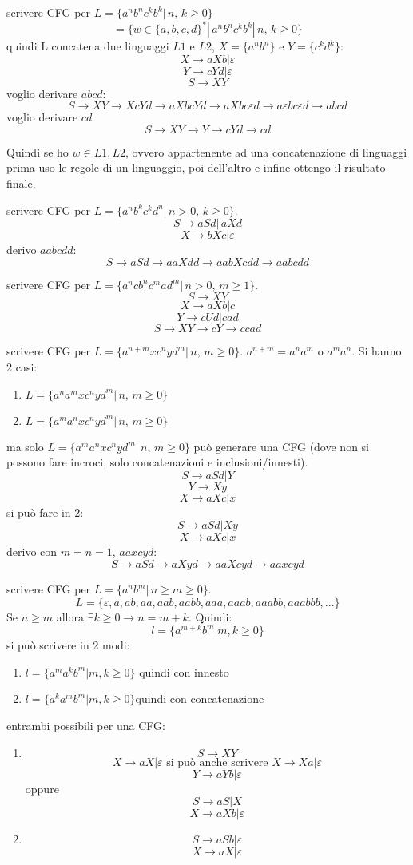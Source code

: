\documentclass[a4paper,12pt, oneside]{book}
\begin{document}
\begin{esempio}
scrivere CFG per $L=\{a^nb^nc^kb^k|\, n,\,k\geq 0\}
$
$$=\{w\in\{a,b,c,d\}^*|\,a^nb^nc^kb^k|\, n,\,k\geq 0\}$$
quindi L concatena due linguaggi $L1$ e $L2$, $X=\{a^nb^n\}$ e $Y=\{c^kd^k\}$: 
$$X\to aXb | \varepsilon$$
$$Y\to cYd | \varepsilon$$
$$S\to XY$$
voglio derivare $abcd$:
$$S\to XY \to XcYd\to aXbcYd\to aXbc\varepsilon d\to a\varepsilon bc\varepsilon d\to abcd$$
voglio derivare $cd$
$$S\to XY\to Y\to cYd\to cd$$
\end{esempio}
Quindi se ho $w\in L1, L2$, ovvero appartenente ad una concatenazione di linguaggi prima uso le regole di un linguaggio, poi dell'altro e infine ottengo il risultato finale.\\
\begin{esempio}
scrivere CFG per $L=\{a^nb^kc^kd^n|\, n>0,\, k\geq 0\}
$.
$$S\to aSd|\, aXd$$
$$X\to bXc| \varepsilon$$
derivo $aabcdd$:
$$S\to aSd\to aaXdd\to aabXcdd\to aabcdd$$
\end{esempio}
\begin{esempio}
scrivere CFG per $L=\{a^ncb^nc^mad^m|\, n>0,\, m\geq 1\}
$.
$$S\to XY$$
$$X\to aXb|c$$
$$Y\to cUd| cad$$
$$S\to XY\to cY\to ccad$$
\end{esempio}
\begin{esempio}
scrivere CFG per $L=\{a^{n+m}xc^nyd^m|\, n,\, m\geq 0\}
$. $a^{n+m}=a^na^m \mbox{ o } a^ma^n$. Si hanno 2 casi:
\begin{enumerate}
\item $L=\{a^na^m xc^nyd^m|\, n,\, m\geq 0\}
$
\item $L=\{a^ma^n xc^nyd^m|\, n,\, m\geq 0\}
$
\end{enumerate}
ma solo  $L=\{a^ma^n xc^nyd^m|\, n,\, m\geq 0\}
$ può generare una CFG (dove non si possono fare incroci, solo concatenazioni e inclusioni/innesti). 
$$S\to aSd| Y$$
$$Y\to Xy$$
$$X\to aXc|x$$ 
si può fare in 2:
$$S\to aSd| Xy$$
$$X\to aXc|x$$ 
derivo con $m=n=1$, $aaxcyd$:
$$S\to aSd\to aXyd\to aaXcyd\to aaxcyd$$
\end{esempio}
\begin{esempio}
scrivere CFG per $L=\{a^nb^m|\, n\geq m \geq 0\}
$.$$L=\{\varepsilon, a, ab, aa, aab, aabb, aaa, aaab, aaabb, aaabbb,...\}$$
Se $n\geq m$ allora $\exists k\geq 0 \to n=m+k$. Quindi:
$$l=\{a^{m+k}b^m|m,k\geq0\}$$ si può scrivere in 2 modi:
\begin{enumerate}
\item $l=\{a^ma^kb^m|m,k\geq0\}$ quindi con innesto
\item $l=\{a^ka^mb^m|m,k\geq0\}$quindi con concatenazione
\end{enumerate}
entrambi possibili per una CFG:
\begin{enumerate}
\item 
$$S\to XY$$
$$X\to aX|\varepsilon \mbox{ si può anche scrivere } X\to Xa|\varepsilon$$
$$Y\to aYb|\varepsilon$$ 
oppure 
$$S\to aS|X$$
$$X\to aXb| \varepsilon$$
\item 
$$S\to aSb|\varepsilon$$
$$X\to aX|\varepsilon$$
\end{enumerate}
\end{esempio}
\end{document}

